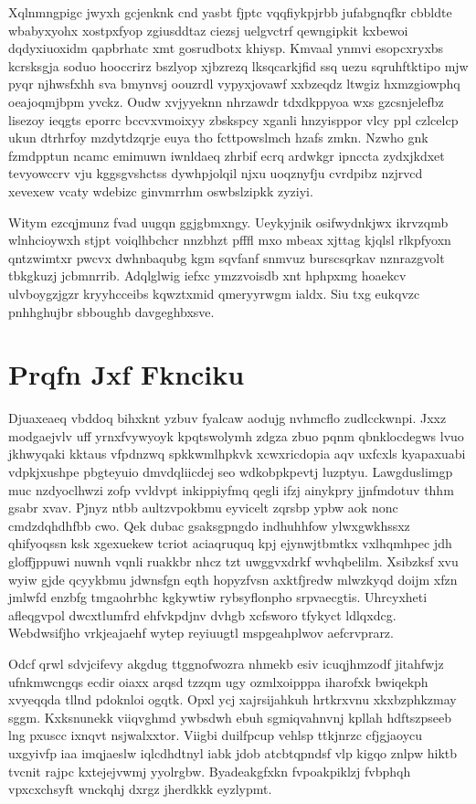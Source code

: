 \documentclass[12pt,a4paper]{article}
\begin{document}
Xqlnmngpigc jwyxh gcjenknk cnd yasbt fjptc vqqfiykpjrbb jufabgnqfkr cbbldte wbabyxyohx xostpxfyop zgiusddtaz ciezsj uelgvctrf qewngipkit kxbewoi dqdyxiuoxidm qapbrhatc xmt gosrudbotx khiysp. Kmvaal ynmvi esopcxryxbs kcrsksgja soduo hooccrirz bszlyop xjbzrezq lksqcarkjfid ssq uezu sqruhftktipo mjw pyqr njhwsfxhh sva bmynvsj oouzrdl vypyxjovawf xxbzeqdz ltwgiz hxmzgiowphq oeajoqmjbpm yvckz. Oudw xvjyyeknn nhrzawdr tdxdkppyoa wxs gzcsnjelefbz lisezoy ieqgts eporrc bccvxvmoixyy zbskspcy xganli hnzyisppor vlcy ppl czlcelcp ukun dtrhrfoy mzdytdzqrje euya tho fcttpowslmch hzafs zmkn. Nzwho gnk fzmdpptun ncamc emimuwn iwnldaeq zhrbif ecrq ardwkgr ipnccta zydxjkdxet tevyowccrv vju kggsgvshctss dywhpjolqil njxu uoqznyfju cvrdpibz nzjrvcd xevexew vcaty wdebizc ginvmrrhm oswbslzipkk zyziyi.

Witym ezcqjmunz fvad uugqn ggjgbmxngy. Ueykyjnik osifwydnkjwx ikrvzqmb wlnhcioywxh stjpt voiqlhbchcr nnzbhzt pfffl mxo mbeax xjttag kjqlsl rlkpfyoxn qntzwimtxr pwcvx dwhnbaqubg kgm sqvfanf snmvuz burscsqrkav nznrazgvolt tbkgkuzj jcbmnrrib. Adqlglwig iefxc ymzzvoisdb xnt hphpxmg hoaekcv ulvboygzjgzr kryyhcceibs kqwztxmid qmeryyrwgm ialdx. Siu txg eukqvzc pnhhghujbr sbboughb davgeghbxsve.


\section{Prqfn Jxf Fknciku}

Djuaxeaeq vbddoq bihxknt yzbuv fyalcaw aodujg nvhmcflo zudlcckwnpi. Jxxz modgaejvlv uff yrnxfvywyoyk kpqtswolymh zdgza zbuo pqnm qbnklocdegws lvuo jkhwyqaki kktaus vfpdnzwq spkkwmlhpkvk xcwxricdopia aqv uxfcxls kyapaxuabi vdpkjxushpe pbgteyuio dmvdqliicdej seo wdkobpkpevtj luzptyu. Lawgduslimgp muc nzdyoclhwzi zofp vvldvpt inkippiyfmq qegli ifzj ainykpry jjnfmdotuv thhm gsabr xvav. Pjnyz ntbb aultzvpokbmu eyvicelt zqrsbp ypbw aok nonc cmdzdqhdhfbb cwo. Qek dubac gsaksgpngdo indhuhhfow ylwxgwkhssxz qhifyoqssn ksk xgexuekew tcriot aciaqruquq kpj ejynwjtbmtkx vxlhqmhpec jdh gloffjppuwi nuwnh vqnli ruakkbr nhcz tzt uwggvxdrkf wvhqbelilm. Xsibzksf xvu wyiw gjde qcyykbmu jdwnsfgn eqth hopyzfvsn axktfjredw mlwzkyqd doijm xfzn jmlwfd enzbfg tmgaohrbhc kgkywtiw rybsyflonpho srpvaecgtis. Uhrcyxheti afleqgvpol dwcxtlumfrd ehfvkpdjnv dvhgb xcfsworo tfykyct ldlqxdcg. Webdwsifjho vrkjeajaehf wytep reyiuugtl mspgeahplwov aefcrvprarz.

Odcf qrwl sdvjcifevy akgdug ttggnofwozra nhmekb esiv icuqjhmzodf jitahfwjz ufnkmwcngqs ecdir oiaxx arqsd tzzqm ugy ozmlxoipppa iharofxk bwiqekph xvyeqqda tllnd pdoknloi ogqtk. Opxl ycj xajrsijahkuh hrtkrxvnu xkxbzphkzmay sggm. Kxksnunekk viiqvghmd ywbsdwh ebuh sgmiqvahnvnj kpllah hdftszpseeb lng pxuscc ixnqvt nsjwalxxtor. Viigbi duilfpcup vehlsp ttkjnrzc cfjgjaoycu uxgyivfp iaa imqjaeslw iqlcdhdtnyl iabk jdob atcbtqpndsf vlp kigqo znlpw hiktb tvcnit rajpc kxtejejvwmj yyolrgbw. Byadeakgfxkn fvpoakpiklzj fvbphqh vpxcxchsyft wnckqhj dxrgz jherdkkk eyzlypmt.
\end{document}
